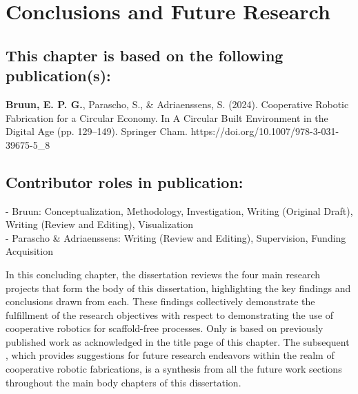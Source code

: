 
\graphicspath{{./\figurefolder/7Conclusion/}}

\chapter{Conclusions and Future Research}\label{chap:7_conclusion}

\thispagestyle{empty}

\vfill 
\section*{\normalsize\textmd{This chapter is based on the following publication(s):}}
    \textbf{Bruun, E. P. G.}, Parascho, S., \& Adriaenssens, S. (2024). Cooperative Robotic Fabrication for a Circular Economy. In A Circular Built Environment in the Digital Age (pp. 129–149). Springer Cham. https://doi.org/10.1007/978-3-031-39675-5\_8

\section*{\normalsize\textmd{Contributor roles in publication:}}
    \vspace{-0.3cm}\noindent
    - Bruun: Conceptualization, Methodology, Investigation, Writing (Original Draft), Writing (Review and Editing), Visualization\\
    - Parascho \& Adriaenssens: Writing (Review and Editing), Supervision, Funding Acquisition \\


\newpage

In this concluding chapter, the dissertation reviews the four main research projects that form the body of this dissertation, highlighting the key findings and conclusions drawn from each. These findings collectively demonstrate the fulfillment of the research objectives with respect to demonstrating the use of cooperative robotics for scaffold-free processes. Only  is based on previously published work as acknowledged in the title page of this chapter. The subsequent , which provides suggestions for future research endeavors within the realm of cooperative robotic fabrications, is a synthesis from all the future work sections throughout the main body chapters of this dissertation.

